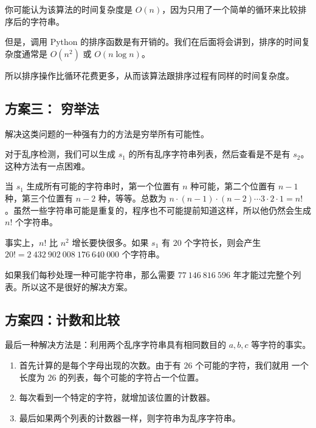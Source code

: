 \begin{frame}\ft{\subsecname}

  你可能认为该算法的时间复杂度是 $O(n)$，因为只用了一个简单的循环来比较排序后的字符串。 \pause 

  但是，调用 Python 的排序函数是有开销的。我们在后面将会讲到，排序的时间复杂度通常是 $O(n^2)$ 或 $O(n\log n)$。\pause 


  所以排序操作比循环花费更多，从而该算法跟排序过程有同样的时间复杂度。
\end{frame}

\subsection{方案三： 穷举法}

\begin{frame}\ft{\subsecname}

  解决这类问题的一种强有力的方法是穷举所有可能性。 \pause 


  对于乱序检测，我们可以生成 $s_1$ 的所有乱序字符串列表，然后查看是不是有 $s_2$。这种方法有一点困难。 \pause 

  当 $s_1$ 生成所有可能的字符串时，第一个位置有 $n$ 种可能，第二个位置有 $n-1$ 种，第三个位置有 $n-2$ 种，等等。总数为 $n\cdot(n-1)\cdot(n-2)\cdots 3\cdot 2\cdot 1=n!$。虽然一些字符串可能是重复的，程序也不可能提前知道这样，所以他仍然会生成 $n!$ 个字符串。 \pause 

  事实上，$n!$ 比 $n^2$ 增长要快很多。如果 $s_1$ 有 $20$ 个字符长，则会产生 $20! = 2~432~902~008~176~640~000$ 个字符串。

  如果我们每秒处理一种可能字符串，那么需要 $77~146~816~596$ 年才能过完整个列表。所以这不是很好的解决方案。
\end{frame}

\subsection{方案四：计数和比较}

\begin{frame}\ft{\subsecname}
  最后一种解决方法是：利用两个乱序字符串具有相同数目的 $a, b, c$ 等字符的事实。
  \begin{enumerate}
  \item 首先计算的是每个字母出现的次数。由于有 $26$ 个可能的字符，我们就用 一个长度为 $26$ 的列表，每个可能的字符占一个位置。
  \item 每次看到一个特定的字符，就增加该位置的计数器。
  \item 最后如果两个列表的计数器一样，则字符串为乱序字符串。 
  \end{enumerate}
\end{frame}

